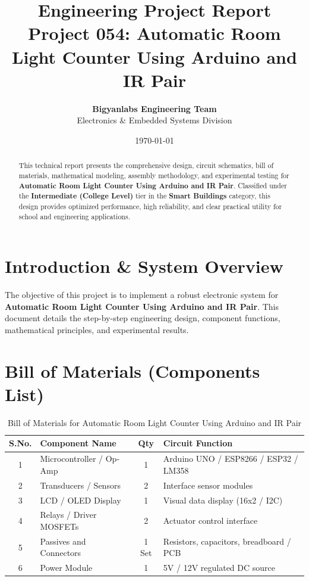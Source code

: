 \documentclass[11pt,a4paper]{article}
\title{\textbf{\Huge Engineering Project Report}\\[0.5em] \Large Project 054: Automatic Room Light Counter Using Arduino and IR Pair}
\author{\textbf{Bigyanlabs Engineering Team}\\ Electronics \& Embedded Systems Division}
\date{\today}
\begin{document}
\maketitle
\thispagestyle{empty}

\begin{abstract}
This technical report presents the comprehensive design, circuit schematics, bill of materials, mathematical modeling, assembly methodology, and experimental testing for \textbf{Automatic Room Light Counter Using Arduino and IR Pair}. Classified under the \textbf{Intermediate (College Level)} tier in the \textbf{Smart Buildings} category, this design provides optimized performance, high reliability, and clear practical utility for school and engineering applications.
\end{abstract}

\newpage
\tableofcontents
\newpage

\section{Introduction \& System Overview}
The objective of this project is to implement a robust electronic system for \textbf{Automatic Room Light Counter Using Arduino and IR Pair}. This document details the step-by-step engineering design, component functions, mathematical principles, and experimental results.

\section{Bill of Materials (Components List)}
\begin{table}[h!]
\centering
\caption{Bill of Materials for Automatic Room Light Counter Using Arduino and IR Pair}
\vspace{0.5em}
\begin{tabular}{clcp{7cm}}
\toprule
\textbf{S.No.} & \textbf{Component Name} & \textbf{Qty} & \textbf{Circuit Function} \\
\midrule
1 & Microcontroller / Op-Amp & 1 & Arduino UNO / ESP8266 / ESP32 / LM358 \\
2 & Transducers / Sensors & 2 & Interface sensor modules \\
3 & LCD / OLED Display & 1 & Visual data display (16x2 / I2C) \\
4 & Relays / Driver MOSFETs & 2 & Actuator control interface \\
5 & Passives and Connectors & 1 Set & Resistors, capacitors, breadboard / PCB \\
6 & Power Module & 1 & 5V / 12V regulated DC source \\
\bottomrule
\end{tabular}
\end{table}
\end{document}
